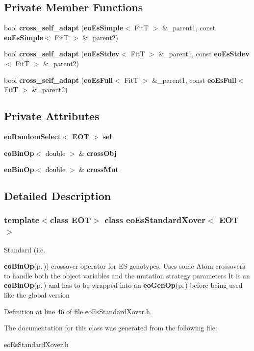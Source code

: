 \subsection*{Private Member Functions}
\begin{CompactItemize}
\item 
bool {\bf cross\_\-self\_\-adapt} ({\bf eo\-Es\-Simple}$<$ Fit\-T $>$ \&\_\-parent1, const {\bf eo\-Es\-Simple}$<$ Fit\-T $>$ \&\_\-parent2)\label{classeo_es_standard_xover_d0}

\item 
bool {\bf cross\_\-self\_\-adapt} ({\bf eo\-Es\-Stdev}$<$ Fit\-T $>$ \&\_\-parent1, const {\bf eo\-Es\-Stdev}$<$ Fit\-T $>$ \&\_\-parent2)\label{classeo_es_standard_xover_d1}

\item 
bool {\bf cross\_\-self\_\-adapt} ({\bf eo\-Es\-Full}$<$ Fit\-T $>$ \&\_\-parent1, const {\bf eo\-Es\-Full}$<$ Fit\-T $>$ \&\_\-parent2)\label{classeo_es_standard_xover_d2}

\end{CompactItemize}
\subsection*{Private Attributes}
\begin{CompactItemize}
\item 
{\bf eo\-Random\-Select}$<$ {\bf EOT} $>$ {\bf sel}\label{classeo_es_standard_xover_r0}

\item 
{\bf eo\-Bin\-Op}$<$ double $>$ \& {\bf cross\-Obj}\label{classeo_es_standard_xover_r1}

\item 
{\bf eo\-Bin\-Op}$<$ double $>$ \& {\bf cross\-Mut}\label{classeo_es_standard_xover_r2}

\end{CompactItemize}


\subsection{Detailed Description}
\subsubsection*{template$<$class EOT$>$ class eo\-Es\-Standard\-Xover$<$ EOT $>$}

Standard (i.e. 

{\bf eo\-Bin\-Op}{\rm (p.\,\pageref{classeo_bin_op})}) crossover operator for ES genotypes. Uses some Atom crossovers to handle both the object variables and the mutation strategy parameters It is an {\bf eo\-Bin\-Op}{\rm (p.\,\pageref{classeo_bin_op})} and has to be wrapped into an {\bf eo\-Gen\-Op}{\rm (p.\,\pageref{classeo_gen_op})} before being used like the global version 



Definition at line 46 of file eo\-Es\-Standard\-Xover.h.

The documentation for this class was generated from the following file:\begin{CompactItemize}
\item 
eo\-Es\-Standard\-Xover.h\end{CompactItemize}
